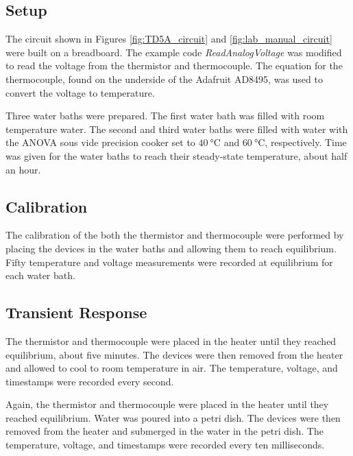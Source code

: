 \subsection{Setup}
\noindent The circuit shown in Figures \ref{fig:TD5A_circuit} and \ref{fig:lab_manual_circuit} were built on a breadboard. The example code \textit{ReadAnalogVoltage} 
was modified to read the voltage from the thermistor and thermocouple. The equation for the thermocouple, found on the underside of the Adafruit AD8495, 
was used to convert the voltage to temperature.

Three water baths were prepared. The first water bath was filled with room temperature water. The second and third water baths were filled with water 
with the ANOVA sous vide precision cooker set to $\qty{40}{\celsius}$ and $\qty{60}{\celsius}$, respectively. Time was given for the water baths to reach
their steady-state temperature, about half an hour.

\subsection{Calibration}
\noindent The calibration of the both the thermistor and thermocouple were performed by placing the devices in the water baths and allowing them to reach
equilibrium. Fifty temperature and voltage measurements were recorded at equilibrium for each water bath. 

\subsection{Transient Response}
The thermistor and thermocouple were placed in the heater until they reached equilibrium, about five minutes. The devices were then removed from the heater
and allowed to cool to room temperature in air. The temperature, voltage, and timestamps were recorded every second. 

Again, the thermistor and thermocouple were placed in the heater until they reached equilibrium. Water was poured into a petri dish.
The devices were then removed from the heater and submerged in the water in the petri dish. The temperature, voltage, and timestamps were recorded 
every ten milliseconds. 
